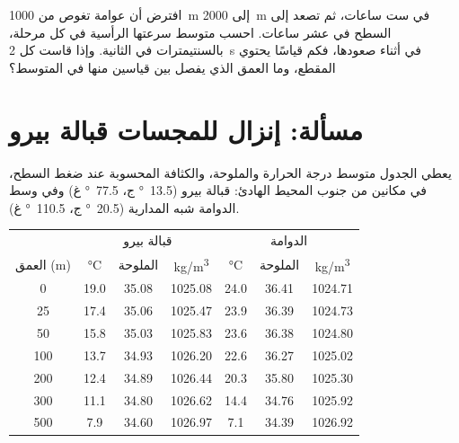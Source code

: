 \begin{exercise}[$\star\star\star$]\label{exo:g10:layered-ocean:15}
افترض أن عوامة تغوص من \qty{1000}{m} إلى \qty{2000}{m} في ست
ساعات، ثم تصعد إلى السطح في عشر ساعات. احسب متوسط سرعتها الرأسية
في كل مرحلة، بالسنتيمترات في الثانية. وإذا قاست كل \qty{2}{s} في أثناء
صعودها، فكم قياسًا يحتوي المقطع، وما
العمق الذي يفصل بين قياسين منها في المتوسط؟
\end{exercise}

\section{مسألة: إنزال للمجسات قبالة بيرو}

\begin{problem}
\label{pb:g10:layered-ocean:1}
يعطي الجدول متوسط درجة الحرارة والملوحة، والكثافة المحسوبة عند ضغط السطح، في
مكانين من جنوب المحيط الهادئ: قبالة بيرو (\qty{13.5}{\degree} ج، \qty{77.5}{\degree} غ)
وفي وسط الدوامة شبه المدارية (\qty{20.5}{\degree} ج، \qty{110.5}{\degree} غ).

\begin{center}
\small
\begin{tabular}{c|ccc|ccc}
\hline
 & \multicolumn{3}{c|}{قبالة بيرو} & \multicolumn{3}{c}{الدوامة} \\
العمق (\unit{m}) & \unit{\degreeCelsius} & الملوحة & \unit{kg/m^3} & \unit{\degreeCelsius} & الملوحة & \unit{kg/m^3} \\
\hline
0 & 19.0 & 35.08 & 1025.08 & 24.0 & 36.41 & 1024.71 \\
25 & 17.4 & 35.06 & 1025.47 & 23.9 & 36.39 & 1024.73 \\
50 & 15.8 & 35.03 & 1025.83 & 23.6 & 36.38 & 1024.80 \\
100 & 13.7 & 34.93 & 1026.20 & 22.6 & 36.27 & 1025.02 \\
200 & 12.4 & 34.89 & 1026.44 & 20.3 & 35.80 & 1025.30 \\
300 & 11.1 & 34.80 & 1026.62 & 14.4 & 34.76 & 1025.92 \\
500 & 7.9 & 34.60 & 1026.97 & 7.1 & 34.39 & 1026.92 \\
\hline
\end{tabular}
\end{center}


\end{problem}
